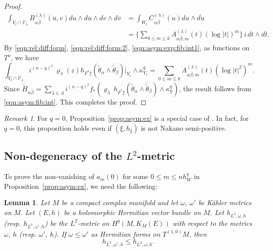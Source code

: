 \documentclass[amscd, leqno]{amsart}
\theoremstyle{plain}
\newtheorem{lemma}[theorem]{Lemma}
\theoremstyle{definition}
\theoremstyle{remark}
\newtheorem{remark}[theorem]{Remark}
\newenvironment{pf}{\begin{proof}}{\end{proof}}
\begin{document}
\begin{pf}
\begin{equation}
\begin{aligned}
\int_{Y_{t}\cap {\mathcal V}_{\lambda}} B_{\alpha\bar{\beta}}^{(\lambda)}(u, v) du \wedge d\overline{u} \wedge dv \wedge d\overline{v} 
&= 
\int_{W_{t}} C_{\alpha\bar{\beta}}^{(\lambda)}(u) du\wedge \overline{du}
\\
&=
\{ \sum_{0 \leq m \leq k} A_{\alpha\bar{\beta};m}^{(\lambda)}(t) ( \log |t| )^{m} \}\, i \, dt \wedge d \overline{t}.
\end{aligned}
\end{equation}
By \eqref{eqn:rel:diff:form}, \eqref{eqn:rel:diff:form:2}, \eqref{eqn:asym:exp:fib:int1}, as functions on $T^{o}$, we have
\begin{equation}
\label{eqn:asym:fib:int}
\int_{Y_{t}\cap{\mathcal V}_{\lambda}} i^{(n-q)^{2}}\,\varrho_{\lambda}(z)
h_{F^{*}{\xi}}(\widetilde{\theta}_{\alpha}\wedge\overline{\widetilde{\theta}}_{\beta})|_{Y_{t}}\wedge\kappa_{Y_{t}}^{q}
=
\sum_{0 \leq m \leq k} A_{\alpha\bar{\beta};m}^{(\lambda)}(t) (\log|t|^{2})^{m}.
\end{equation}
Since
$\widetilde{H}_{\alpha\bar{\beta}} =\sum_{\lambda\in\Lambda}i^{(n-q)^{2}}
f_{*}(\varrho_{\lambda}\,h_{F^{*}{\xi}}(\widetilde{\theta}_{\alpha}\wedge\overline{\widetilde{\theta}}_{\beta})\wedge\kappa_{Y}^{q})$,
the result follows from \eqref{eqn:asym:fib:int}. This completes the proof.
\end{pf}


\begin{remark}
For $q=0$, Proposition~\ref{prop:asym:ex} is a special case of \cite[Prop.\,6.1]{Takayama22}. 
In fact, for $q=0$, this proposition holds even if $(\xi, h_{\xi})$ is not Nakano semi-positive.
\end{remark}




\subsection
{Non-degeneracy of the $L^{2}$-metric}
\label{sect:4.5}
\par
To prove the non-vanishing of $a_{m}(0)$ for some $0 \leq m \leq n h_{W}^{q}$ in Proposition~\ref{prop:asym:ex}, 
we need the following:


\begin{lemma}
\label{lemma:comparison:L2}
Let $M$ be a compact complex manifold and let $\omega$, $\omega'$ be K\"ahler metrics on $M$. 
Let $(E,h)$ be a holomorphic Hermitian vector bundle on $M$.
Let $h_{L^{2},\omega,h}$ (resp. $h_{L^{2},\omega',h}$) be the $L^{2}$-metric on $H^{q}(M, K_{M}(E))$ with respect to 
the metrics $\omega$, $h$ (resp. $\omega'$, $h$). If $\omega \leq \omega'$ as Hermitian forms on $T^{(1,0)}M$, then
$$
h_{L^{2},\omega',h} \leq h_{L^{2},\omega,h}.
$$
\end{lemma}
\end{document}
